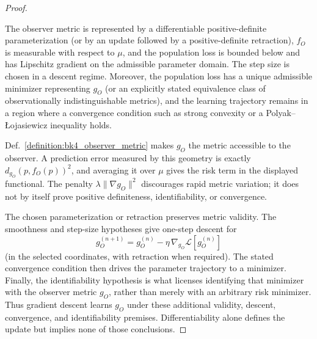 \begin{proof}
\label{proof:bk4_ml_metric_learning}
\leavevmode

\begin{assumption}
The observer metric is represented by a differentiable positive-definite
parameterization (or by an update followed by a positive-definite retraction),
$f_O$ is measurable with respect to $\mu$, and the population loss is bounded
below and has Lipschitz gradient on the admissible parameter domain. The step
size is chosen in a descent regime. Moreover, the population loss has a unique
admissible minimizer representing $g_O$ (or an explicitly stated equivalence
class of observationally indistinguishable metrics), and the learning
trajectory remains in a region where a convergence condition such as strong
convexity or a Polyak--\L{}ojasiewicz inequality holds.
\end{assumption}

Def.~\ref{definition:bk4_observer_metric} makes $g_O$ the metric accessible to
the observer. A prediction error measured by this geometry is exactly
$d_{g_O}(p,f_O(p))^2$, and averaging it over $\mu$ gives the risk term in the
displayed functional. The penalty $\lambda\|\nabla g_O\|^2$ discourages rapid
metric variation; it does not by itself prove positive definiteness,
identifiability, or convergence.

The chosen parameterization or retraction preserves metric validity. The
smoothness and step-size hypotheses give one-step descent for
\[
g_O^{(n+1)}=g_O^{(n)}-\eta\,\nabla_{g_O}\mathcal L[g_O^{(n)}]
\]
(in the selected coordinates, with retraction when required). The stated
convergence condition then drives the parameter trajectory to a minimizer.
Finally, the identifiability hypothesis is what licenses identifying that
minimizer with the observer metric $g_O$, rather than merely with an arbitrary
risk minimizer. Thus gradient descent learns $g_O$ under these additional
validity, descent, convergence, and identifiability premises. Differentiability
alone defines the update but implies none of those conclusions.
\end{proof}

